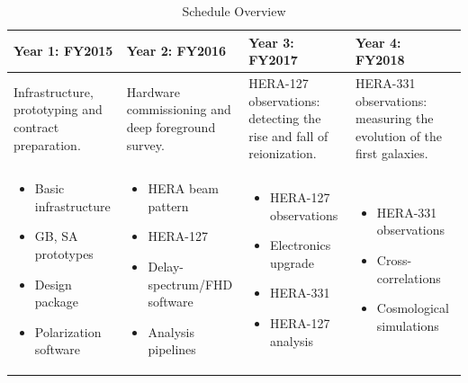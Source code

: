 \documentclass[preprint]{aastex}
\begin{document}
\begin{table}[h]
\centering
\caption{Schedule Overview}
\label{tab:scheduleSummary}
\begin{tabular}{| p{1.5in} | p{1.5in} | p{1.5in} | p{1.5in} |}\hline
\textbf{Year 1}:  FY2015   &  \textbf{Year 2}:  FY2016  &  \textbf{Year 3}:  FY2017 & \textbf{Year 4}:  FY2018 \\ \hline
\raggedright{Infrastructure, prototyping and contract preparation.} &
\raggedright{Hardware commissioning and deep foreground survey.} &
\raggedright{HERA-127 observations:  detecting the rise and fall of reionization.} &
HERA-331 observations:  measuring the evolution of the first galaxies. \\ \hline  %
\begin{itemize}[noitemsep,nolistsep,leftmargin=12pt]
\item Basic infrastructure
\item GB, SA prototypes
\item Design package
\item Polarization software
\end{itemize} &
\begin{itemize}[noitemsep,nolistsep,leftmargin=12pt]
\item HERA beam pattern
\item HERA-127
\item Delay-spectrum/FHD software
\item Analysis pipelines
\end{itemize} &
\begin{itemize}[noitemsep,nolistsep,leftmargin=12pt]
\item HERA-127 observations
\item Electronics upgrade
\item HERA-331
\item HERA-127 analysis
\end{itemize} &
\begin{itemize}[noitemsep,nolistsep,leftmargin=12pt]
\item HERA-331 observations
\item Cross-correlations
\item Cosmological simulations
\end{itemize} \\ \hline
\end{tabular}
\end{table}
\end{document}
